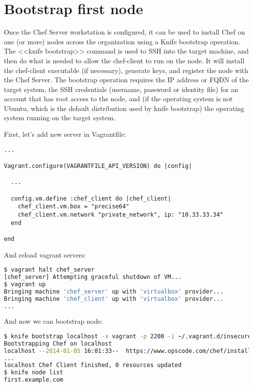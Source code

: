 \section{Bootstrap first node}

Once the Chef Server workstation is configured, it can be used to install Chef on one (or more) nodes across the organization using a Knife bootstrap operation. The <<knife bootstrap>> command is used to SSH into the target machine, and then do what is needed to allow the chef-client to run on the node. It will install the chef-client executable (if necessary), generate keys, and register the node with the Chef Server. The bootstrap operation requires the IP address or FQDN of the target system, the SSH credentials (username, password or identity file) for an account that has root access to the node, and (if the operating system is not Ubuntu, which is the default distribution used by knife bootstrap) the operating system running on the target system.

First, let's add new server in Vagrantfile:

\begin{lstlisting}[label=lst:my-server-cloud-node1,title=my-server-cloud/Vagrantfile]
...

Vagrant.configure(VAGRANTFILE_API_VERSION) do |config|

  ...

  config.vm.define :chef_client do |chef_client|
    chef_client.vm.box = "precise64"
    chef_client.vm.network "private_network", ip: "10.33.33.34"
  end

end
\end{lstlisting}

And reload vagrant servers:

\begin{lstlisting}[language=Bash,label=lst:my-server-cloud-node2]
$ vagrant halt chef_server
[chef_server] Attempting graceful shutdown of VM...
$ vagrant up
Bringing machine 'chef_server' up with 'virtualbox' provider...
Bringing machine 'chef_client' up with 'virtualbox' provider...
...
\end{lstlisting}

And now we can bootstrap node:

\begin{lstlisting}[language=Bash,label=lst:my-server-cloud-node3]
$ knife bootstrap localhost -x vagrant -p 2200 -i ~/.vagrant.d/insecure_private_key -N first.example.com --sudo
Bootstrapping Chef on localhost
localhost --2014-01-05 16:01:33--  https://www.opscode.com/chef/install.sh
...
localhost Chef Client finished, 0 resources updated
$ knife node list
first.example.com
\end{lstlisting}

